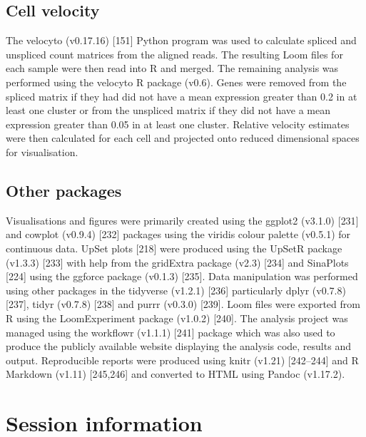 \documentclass[11pt,a4paper,titlepage,twoside,openright]{style/unimelbthesis}
\theoremstyle{definition}
\theoremstyle{definition}
\theoremstyle{definition}
\theoremstyle{remark}
\begin{document}
\begin{mainmatter}
\hypertarget{cell-velocity-1}{%
\section{Cell velocity}\label{cell-velocity-1}}

The velocyto (v0.17.16) {[}151{]} Python program was used to calculate spliced and unspliced count matrices from the aligned reads. The resulting Loom files for each sample were then read into R and merged. The remaining analysis was performed using the velocyto R package (v0.6). Genes were removed from the spliced matrix if they had did not have a mean expression greater than 0.2 in at least one cluster or from the unspliced matrix if they did not have a mean expression greater than 0.05 in at least one cluster. Relative velocity estimates were then calculated for each cell and projected onto reduced dimensional spaces for visualisation.

\hypertarget{other-packages}{%
\section{Other packages}\label{other-packages}}

Visualisations and figures were primarily created using the ggplot2 (v3.1.0) {[}231{]} and cowplot (v0.9.4) {[}232{]} packages using the viridis colour palette (v0.5.1) for continuous data. UpSet plots {[}218{]} were produced using the UpSetR package (v1.3.3) {[}233{]} with help from the gridExtra package (v2.3) {[}234{]} and SinaPlots {[}224{]} using the ggforce package (v0.1.3) {[}235{]}. Data manipulation was performed using other packages in the tidyverse (v1.2.1) {[}236{]} particularly dplyr (v0.7.8) {[}237{]}, tidyr (v0.7.8) {[}238{]} and purrr (v0.3.0) {[}239{]}. Loom files were exported from R using the LoomExperiment package (v1.0.2) {[}240{]}. The analysis project was managed using the workflowr (v1.1.1) {[}241{]} package which was also used to produce the publicly available website displaying the analysis code, results and output. Reproducible reports were produced using knitr (v1.21) {[}242--244{]} and R Markdown (v1.11) {[}245,246{]} and converted to HTML using Pandoc (v1.17.2).

\hypertarget{session-information-1}{%
\chapter{Session information}\label{session-information-1}}

\clearpage


\end{mainmatter}
\end{document}
